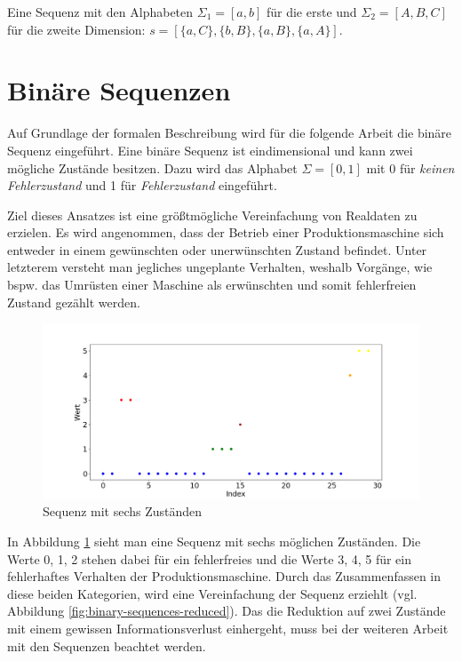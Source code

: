 \begin{theorem}
	Eine Sequenz mit den Alphabeten $\Sigma_{1} = [a,b]$ für die erste und $\Sigma_{2} = [A,B,C]$ für die zweite Dimension: $s = [\{a,C\},\{b,B\},\{a,B\},\{a,A\}]$.
\end{theorem}

\section{Binäre Sequenzen}
\label{chp:binary-sequences}
Auf Grundlage der formalen Beschreibung wird für die folgende Arbeit die binäre Sequenz eingeführt. Eine binäre Sequenz ist eindimensional und kann zwei mögliche Zustände besitzen. Dazu wird das Alphabet $\Sigma = [0,1]$ mit 0 für \textit{keinen Fehlerzustand} und 1 für \textit{Fehlerzustand} eingeführt.

Ziel dieses Ansatzes ist eine größtmögliche Vereinfachung von Realdaten zu erzielen. Es wird angenommen, dass der Betrieb einer Produktionsmaschine sich entweder in einem gewünschten oder unerwünschten Zustand befindet. Unter letzterem versteht man jegliches ungeplante Verhalten, weshalb Vorgänge, wie bspw. das Umrüsten einer Maschine als erwünschten und somit fehlerfreien Zustand gezählt werden. 

\begin{figure}[H]
	\centering
	\includegraphics[scale=0.32]{images/sequences/binary-sequences-full}
	\caption{Sequenz mit sechs Zuständen}
	\label{fig:binary-sequences-full}
\end{figure}

In Abbildung \ref{fig:binary-sequences-full} sieht man eine Sequenz mit sechs möglichen Zuständen. Die Werte 0, 1, 2 stehen dabei für ein fehlerfreies und die Werte 3, 4, 5 für ein fehlerhaftes Verhalten der Produktionsmaschine. Durch das Zusammenfassen in diese beiden Kategorien, wird eine Vereinfachung der Sequenz erziehlt (vgl. Abbildung \ref{fig:binary-sequences-reduced}). Das die Reduktion auf zwei Zustände mit einem gewissen Informationsverlust einhergeht, muss bei der weiteren Arbeit mit den Sequenzen beachtet werden.

